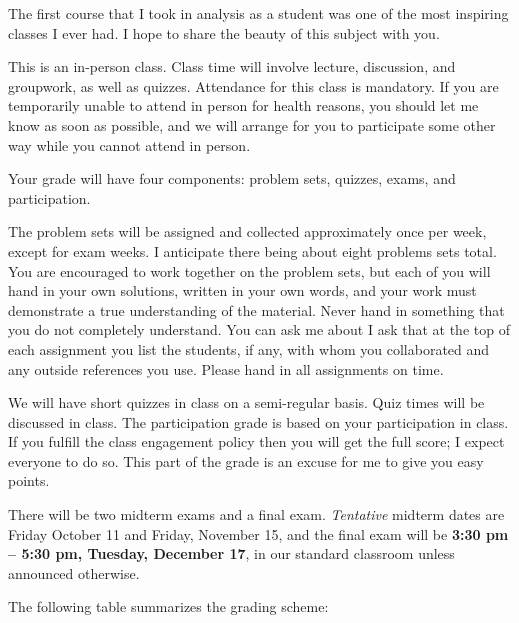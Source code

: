 \documentclass{amsart}
\begin{document}
The first course that I took in analysis as a student was one of the most inspiring classes I ever had. I hope to share the beauty of this subject with you.




\smallskip

This is an in-person class. Class time will involve lecture, discussion, and groupwork, as well as quizzes. Attendance for this class is mandatory. If you are temporarily unable to attend in person for health reasons, you should let me know as soon as possible, and we will arrange for you to participate some other way while you cannot attend in person.



 Your grade will have four components: problem sets, quizzes, exams, and participation. 

The problem sets will be assigned and collected approximately once per week, except for exam weeks. I anticipate there being about eight problems sets total.
You are encouraged to work together on
the problem sets, but each of you will hand in 
your own solutions, written in your own words, and your work must
demonstrate a true understanding of the material. Never hand in
something that you do not completely understand. You can ask me about I ask that at the top of each assignment you list the students, if any, with whom you collaborated and any outside references you use. 
Please hand in all assignments on time.


We will have short quizzes in class on a semi-regular basis. Quiz times will be discussed in class. The participation grade is based on your participation in class. If you fulfill the class engagement policy then you will get the full score; I expect everyone to do so. This part of the grade is an excuse for me to give you easy points.

There will be two midterm exams and a final exam. \emph{Tentative} midterm dates are Friday October 11 and Friday, November 15, and the final exam will be \textbf{3:30 pm -- 5:30 pm, Tuesday, December 17}, in our standard classroom unless announced otherwise.

\newpage

\noindent The following table summarizes the grading scheme:



\bigskip

\medskip
\end{document}
